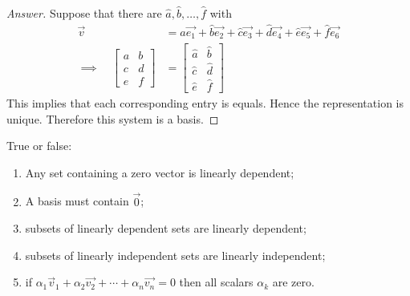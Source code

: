\documentclass{article}
\begin{document}
\begin{proof}[Answer]
  Suppose that there are $\hat{a},\hat{b},\dots,\hat{f}$ with
  \begin{align*}
    \vec{v}&=\hat{a}\vec{e_1}+\hat{b}\vec{e_2}+\hat{c}\vec{e_3}
              +\hat{d}\vec{e_4}+\hat{e}\vec{e_5}+\hat{f}\vec{e_6}\\
    \implies\quad 
    \begin{bmatrix} 
      a&b\\c&d\\e&f 
    \end{bmatrix}
    &=
    \begin{bmatrix} 
      \hat{a} & \hat{b}\\ \hat{c}&\hat{d} \\ \hat{e}&\hat{f}
    \end{bmatrix}
  \end{align*}
  This implies that each corresponding entry is equals. Hence the representation
  is unique. Therefore this system is a basis.




\end{proof}
\begin{exercise}
  True or false:
  \begin{enumerate}
    \item Any set containing a zero vector is linearly dependent;
    \item A basis must contain $\vec{0}$;
    \item subsets of linearly dependent sets are linearly dependent;
    \item subsets of linearly independent sets are linearly independent;
    \item if $\alpha_1\vec{v}_1+\alpha_2\vec{v_2}+\cdots+\alpha_n\vec{v_n}=0$
      then all scalars $\alpha_k$ are zero.
  \end{enumerate}
\end{exercise}
\end{document}
